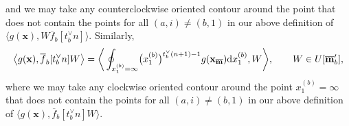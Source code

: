 \documentclass[pdftex]{sigma}
\numberwithin{equation}{section}
\begin{document}
and we may take any counterclockwise oriented contour around the point  that does not contain the points  for all $(a,i)\neq(b,1)$ in our above definition of $\big\langle g(\mathbf{x}),W\overline{f}_b[t_b^{\vee}n]\big\rangle$. Similarly,
\begin{equation*}
\big\langle g(\mathbf{x}),\overline{f}_b[t_b^{\vee}n]W\big\rangle
=\bigg\langle\oint\nolimits_{x_1^{(b)}=\infty}\bigl(x_1^{(b)}\bigr) ^{t_b^{\vee}(n+1)-1} g(\mathbf{x}_{\overline{\mathbf{m}}}){\rm d}x_1^{(b)},W\bigg\rangle, \qquad W\in U[\overline{\mathbf{m}}_b'],
\end{equation*}
where we may take any clockwise oriented contour around the point $x_1^{(b)}=\infty$ that does not contain the points  for all $(a,i)\neq(b,1)$ in our above definition of $\big\langle g(\mathbf{x}),\overline{f}_b[t_b^{\vee}n]W\big\rangle$.
\end{document}

